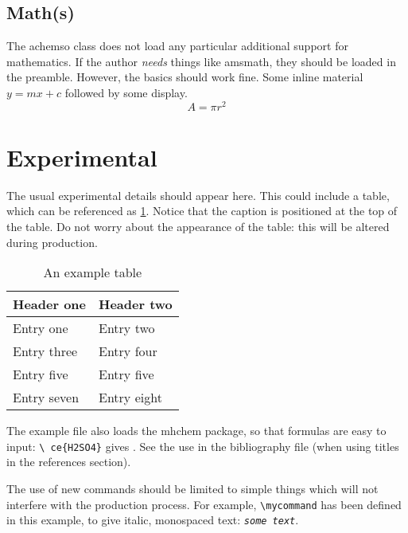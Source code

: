 \documentclass[journal=jacsat,manuscript=article]{achemso}
\newcommand*{\mycommand}[1]{\texttt{\emph{#1}}}
\begin{document}
\subsection{Math(s)}

The \textsf{achemso} class does not load any particular additional
support for mathematics.  If the author \emph{needs} things like
\textsf{amsmath}, they should be loaded in the preamble.  However,
the basics should work fine.  Some inline material $ y = mx + c$
followed by some display. \[ A = \pi r^2 \]

\section{Experimental}

The usual experimental details should appear here.  This could
include a table, which can be referenced as \ref{tbl:example}. Notice
that the caption is positioned at the top of the table. Do not worry
about the appearance of the table: this will be altered during
production.
\begin{table}
  \caption{An example table}
  \label{tbl:example}
  \begin{tabular}{ll}
    \hline
    Header one & Header two \\
    \hline
    Entry one & Entry two \\
    Entry three & Entry four \\
    Entry five & Entry five \\
    Entry seven & Entry eight \\
    \hline
  \end{tabular}
\end{table}

The example file also loads the \textsf{mhchem} package, so
that formulas are easy to input: \texttt{\textbackslash
ce\{H2SO4\}} gives .  See the use in the
bibliography file (when using titles in the references
section).

The use of new commands should be limited to simple things which will
not interfere with the production process.  For example,
\texttt{\textbackslash mycommand} has been defined in this example,
to give italic, monospaced text: \mycommand{some text}.

\acknowledgement
\end{document}
